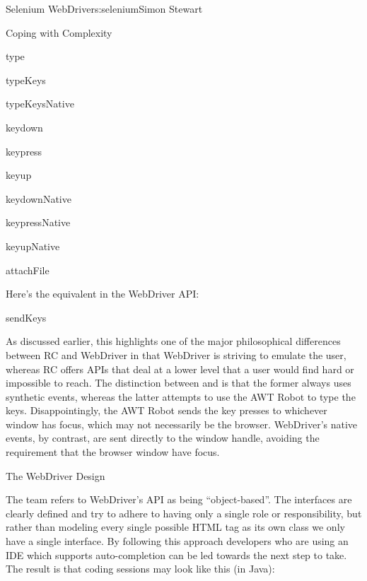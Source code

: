 \begin{aosachapter}{Selenium WebDriver}{s:selenium}{Simon Stewart}
\begin{aosasect1}{Coping with Complexity}
\begin{aosaitemize}

\item type

\item typeKeys

\item typeKeysNative

\item keydown

\item keypress

\item keyup

\item keydownNative

\item keypressNative

\item keyupNative

\item attachFile

\end{aosaitemize}

Here's the equivalent in the WebDriver API:

\begin{aosaitemize}

\item sendKeys

\end{aosaitemize}

As discussed earlier, this highlights one of the major philosophical
differences between RC and WebDriver in that WebDriver is striving to
emulate the user, whereas RC offers APIs that deal at a lower level
that a user would find hard or impossible to reach. The distinction
between  and  is that the former
always uses synthetic events, whereas the latter attempts to use the
AWT Robot to type the keys. Disappointingly, the AWT Robot sends the
key presses to whichever window has focus, which may not necessarily
be the browser. WebDriver's native events, by contrast, are sent
directly to the window handle, avoiding the requirement that the
browser window have focus.

\begin{aosasect2}{The WebDriver Design}

The team refers to WebDriver's API as being ``object-based''. The
interfaces are clearly defined and try to adhere to having only a
single role or responsibility, but rather than modeling every single
possible HTML tag as its own class we only have a single
 interface. By following this approach developers
who are using an IDE which supports auto-completion can be led towards
the next step to take. The result is that coding sessions may
look like this (in Java):


\end{aosasect2}
\end{aosasect1}
\end{aosachapter}
